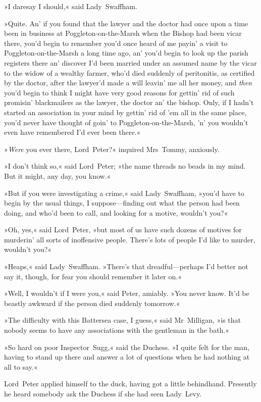 »I daresay I should,« said Lady~Swaffham.

»Quite. An' if you found that the lawyer and the doctor had once upon a time been in business at Poggleton-on-the-Marsh when the Bishop had been vicar there, you'd begin to remember you'd once heard of me payin' a visit to Poggleton-on-the-Marsh a long time ago, an' you'd begin to look up the parish registers there an' discover I'd been married under an assumed name by the vicar to the widow of a wealthy farmer, who'd died suddenly of peritonitis, as certified by the doctor, after the lawyer'd made a will leavin' me all her money, and \textit{then} you'd begin to think I might have very good reasons for gettin' rid of such promisin' blackmailers as the lawyer, the doctor an' the bishop. Only, if I hadn't started an association in your mind by gettin' rid of 'em all in the same place, you'd never have thought of goin' to Poggleton-on-the-Marsh, 'n' you wouldn't even have remembered I'd ever been there.«

»\textit{Were} you ever there, Lord~Peter?« inquired Mrs~Tommy, anxiously.

»I don't think so,« said Lord~Peter; »the name threads no beads in my mind. But it might, any day, you know.«

»But if you were investigating a crime,« said Lady~Swaffham, »you'd have to begin by the usual things, I suppose—finding out what the person had been doing, and who'd been to call, and looking for a motive, wouldn't you?«

»Oh, yes,« said Lord~Peter, »but most of us have such dozens of motives for murderin' all sorts of inoffensive people. There's lots of people I'd like to murder, wouldn't you?«

»Heaps,« said Lady~Swaffham. »There's that dreadful—perhaps I'd better not say it, though, for fear you should remember it later on.«

»Well, I wouldn't if I were you,« said Peter, amiably. »You never know. It'd be beastly awkward if the person died suddenly tomorrow.«

»The difficulty with this Battersea case, I guess,« said Mr~Milligan, »is that nobody seems to have any associations with the gentleman in the bath.«

»So hard on poor Inspector~Sugg,« said the Duchess. »I quite felt for the man, having to stand up there and answer a lot of questions when he had nothing at all to say.«

Lord~Peter applied himself to the duck, having got a little behindhand. Presently he heard somebody ask the Duchess if she had seen Lady~Levy.

